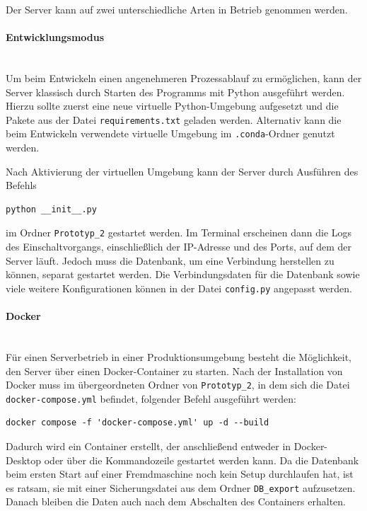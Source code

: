 Der Server kann auf zwei unterschiedliche Arten in Betrieb genommen werden.  

\paragraph{Entwicklungsmodus} \mbox{}\\ 

Um beim Entwickeln einen angenehmeren Prozessablauf zu ermöglichen, kann der Server klassisch durch Starten des Programms mit Python ausgeführt werden.  
Hierzu sollte zuerst eine neue virtuelle Python-Umgebung aufgesetzt und die Pakete aus der Datei \texttt{requirements.txt} geladen werden. Alternativ kann die beim Entwickeln verwendete virtuelle Umgebung im \texttt{.conda}-Ordner genutzt werden.  

Nach Aktivierung der virtuellen Umgebung kann der Server durch Ausführen des Befehls  
\begin{verbatim}
python __init__.py
\end{verbatim}  
im Ordner \texttt{Prototyp\_2} gestartet werden.  
Im Terminal erscheinen dann die Logs des Einschaltvorgangs, einschließlich der IP-Adresse und des Ports, auf dem der Server läuft.  
Jedoch muss die Datenbank, um eine Verbindung herstellen zu können, separat gestartet werden.  
Die Verbindungsdaten für die Datenbank sowie viele weitere Konfigurationen können in der Datei \texttt{config.py} angepasst werden.  

\paragraph{Docker} \mbox{}\\

Für einen Serverbetrieb in einer Produktionsumgebung besteht die Möglichkeit, den Server über einen Docker-Container zu starten.  
Nach der Installation von Docker muss im übergeordneten Ordner von \texttt{Prototyp\_2}, in dem sich die Datei \texttt{docker-compose.yml} befindet, folgender Befehl ausgeführt werden:  

\begin{verbatim}
docker compose -f 'docker-compose.yml' up -d --build
\end{verbatim}  

Dadurch wird ein Container erstellt, der anschließend entweder in Docker-Desktop oder über die Kommandozeile gestartet werden kann.  
Da die Datenbank beim ersten Start auf einer Fremdmaschine noch kein Setup durchlaufen hat, ist es ratsam, sie mit einer Sicherungsdatei aus dem Ordner \texttt{DB\_export} aufzusetzen.  
Danach bleiben die Daten auch nach dem Abschalten des Containers erhalten.  

